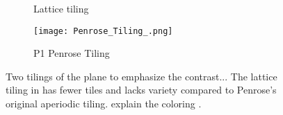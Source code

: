 


\begin{figure}[h!]%
    \centering
    \begin{subfigure}{.47\textwidth}
        \centering
        \caption{Lattice tiling}
        \label{fig:tiling_one}
    \end{subfigure}\quad
    \begin{subfigure}{.47\textwidth}
        \centering
        \texttt{[image: Penrose\_Tiling\_.png]}
        \caption{P1 Penrose Tiling}
        \label{fig:tiling_two}
    \end{subfigure}
    \caption{Two tilings of the plane to emphasize the contrast... The lattice tiling in  has fewer tiles and lacks variety compared to Penrose's original aperiodic tiling. explain the coloring \cite{inductiveloadP1TilingUsing}.}
    \label{fig:tilings_one_two}
\end{figure}
